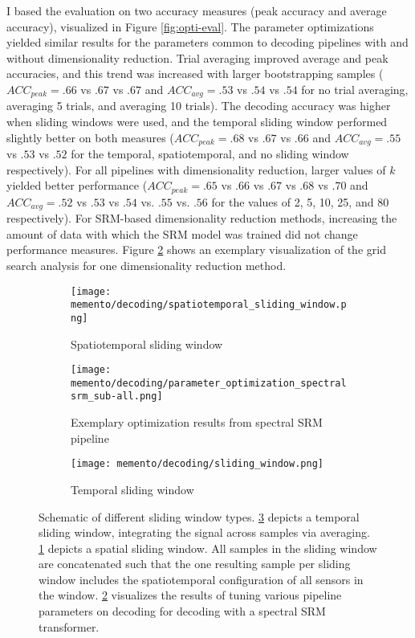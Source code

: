 I based the evaluation on two accuracy measures (peak accuracy and average accuracy), visualized in Figure \ref{fig:opti-eval}.
The parameter optimizations yielded similar results for the parameters common to decoding pipelines with and without dimensionality reduction.
Trial averaging improved average and peak accuracies, and this trend was increased with larger bootstrapping samples ($ACC_{peak} = .66$ vs $.67$ vs $.67$ and $ACC_{avg} = .53$ vs $.54$ vs $.54$ for no trial averaging, averaging 5 trials, and averaging 10 trials).
The decoding accuracy was higher when sliding windows were used, and the temporal sliding window performed slightly better on both measures ($ACC_{peak} = .68$ vs $.67$ vs $.66$ and $ACC_{avg} = .55$ vs $.53$ vs $.52$ for the temporal, spatiotemporal, and no sliding window respectively).
For all pipelines with dimensionality reduction, larger values of $k$ yielded better performance ($ACC_{peak} = .65$ vs $.66$ vs $.67$ vs $.68$ vs $.70$ and $ACC_{avg} = .52$ vs $.53$ vs $.54$ vs. $.55$ vs. $.56$ for the values of 2, 5, 10, 25, and 80 respectively).
For \gls{SRM}-based dimensionality reduction methods, increasing the amount of data with which the \gls{SRM} model was trained did not change performance measures.
Figure \ref{fig:decoding-opti-results} shows an exemplary visualization of the grid search analysis for one dimensionality reduction method.



\begin{figure}
	\begin{subfigure}{0.39\textwidth}
		\texttt{[image: memento/decoding/spatiotemporal\_sliding\_window.png]}
		\caption{Spatiotemporal sliding window}
		\label{fig:spatiotemporal-slider}
	\end{subfigure}
	\begin{subfigure}{0.59\textwidth}
		\texttt{[image: memento/decoding/parameter\_optimization\_spectralsrm\_sub-all.png]}
		\caption{Exemplary optimization results from spectral SRM pipeline}
		\label{fig:decoding-opti-results}
	\end{subfigure}
	\begin{subfigure}{.65\textwidth}
		\texttt{[image: memento/decoding/sliding\_window.png]}
		\caption{Temporal sliding window}
		\label{fig:temporal-slider}
	\end{subfigure}
	\caption[Schematic of different sliding window types and optimization results]{Schematic of different sliding window types. \ref{fig:temporal-slider} depicts a temporal sliding window, integrating the signal across samples via averaging. \ref{fig:spatiotemporal-slider} depicts a spatial sliding window. All samples in the sliding window are concatenated such that the one resulting sample per sliding window includes the spatiotemporal configuration of all sensors in the window.
	\ref{fig:decoding-opti-results} visualizes the results of tuning various pipeline parameters on decoding for decoding with a spectral \gls{SRM} transformer.}
	\label{fig:sliding-windows}
\end{figure}

